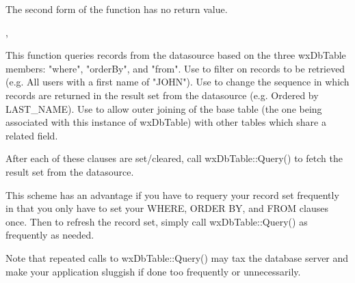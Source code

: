 The second form of the function has no return value.


,

\label{wxdbtablequery}





This function queries records from the datasource based on the three
wxDbTable members: "where", "orderBy", and "from".  Use
 to filter on
records to be retrieved (e.g. All users with a first name of "JOHN").
Use  to
change the sequence in which records are returned in the result set from
the datasource (e.g. Ordered by LAST\_NAME).  Use
 to allow outer
joining of the base table (the one being associated with this instance of
wxDbTable) with other tables which share a related field.

After each of these clauses are set/cleared, call wxDbTable::Query() to
fetch the result set from the datasource.

This scheme has an advantage if you have to requery your record set
frequently in that you only have to set your WHERE, ORDER BY, and FROM
clauses once.  Then to refresh the record set, simply call wxDbTable::Query()
as frequently as needed.

Note that repeated calls to wxDbTable::Query() may tax the database
server and make your application sluggish if done too frequently or
unnecessarily.

